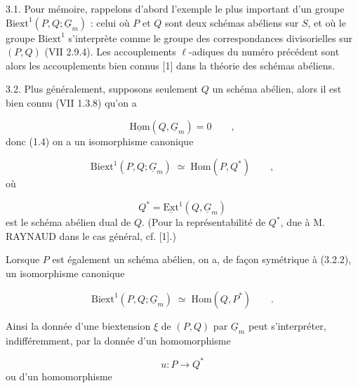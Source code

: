 3.1. Pour mémoire, rappelons d'abord l'exemple le plus important d'un groupe $\mathrm{Biext}^1(P,Q;\underline{G}_m)$ : celui où $P$ et $Q$ sont deux schémas abéliens sur $S$, et où le groupe $\mathrm{Biext}^1$ s'interprète comme le groupe des correspondances divisorielles sur $(P,Q)$ (VII 2.9.4). Les accouplements $\ell$-adiques du numéro précédent sont alors les accouplements bien connus [1] dans la théorie des schémas abéliens.

3.2. Plus généralement, supposons seulement $Q$ un schéma abélien, alors il est bien connu (VII 1.3.8) qu'on a

\begin{equation}\tag{3.2.1}
\underline{\mathrm{Hom}}(Q,\underline{G}_m) = 0 \qquad ,
\end{equation}
donc (1.4) on a un isomorphisme canonique

\begin{equation}\tag{3.2.2}
\mathrm{Biext}^1(P,Q;\underline{G}_m) \;\simeq\; \mathrm{Hom}(P,Q^*) \qquad ,
\end{equation}
où

\begin{equation}\tag{3.2.3}
Q^* = \underline{\mathrm{Ext}}^1(Q,\underline{G}_m)
\end{equation}
est le schéma abélien dual de $Q$. (Pour la représentabilité de $Q^*$, due à M. RAYNAUD dans le cas général, cf. [1].)

Lorsque $P$ est également un schéma abélien, on a, de façon symétrique à (3.2.2), un isomorphisme canonique

\begin{equation}\tag{3.2.4}
\mathrm{Biext}^1(P,Q;\underline{G}_m) \;\simeq\; \mathrm{Hom}(Q,P^*) \qquad .
\end{equation}


Ainsi la donnée d'une biextension $\xi$ de $(P,Q)$ par $\underline{G}_m$ peut s'interpréter, indifféremment, par la donnée d'un homomorphisme

\begin{equation*}
u : P \longrightarrow Q^*
\end{equation*}
ou d'un homomorphisme

